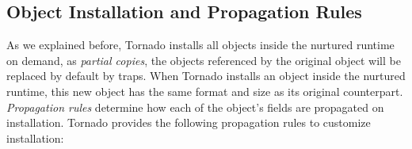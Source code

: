 % 
% 
% 
% 


\subsection{Object Installation and Propagation Rules} \label{sec:mappings}

As we explained before, Tornado installs all objects inside the nurtured runtime on demand, as \emph{partial copies}, \ie the objects referenced by the original object will be replaced by default by traps. %
When Tornado installs an object inside the nurtured runtime, this new object has the same format and size as its original counterpart. \emph{Propagation rules} determine how each of the object's fields are propagated on installation. Tornado provides the following propagation rules to customize installation:

